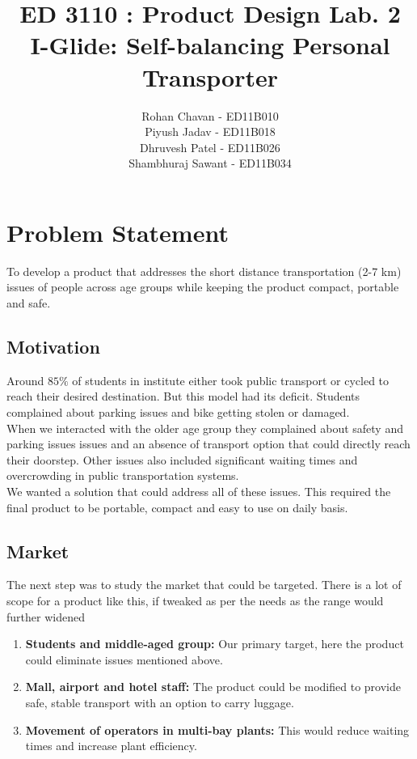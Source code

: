 \documentclass[a4paper , 12pt]{article}
\title{ ED 3110 : Product Design Lab. 2\\
   {\small {\large I-Glide: Self-balancing Personal Transporter}} }
\author{ Rohan Chavan - ED11B010\\
		Piyush Jadav - ED11B018\\
		Dhruvesh Patel - ED11B026\\
		Shambhuraj Sawant - ED11B034
		}
\begin{document}
\maketitle

\begin{abstract}
\textbf{}
\end{abstract}\newpage

\tableofcontents\newpage
\newpage
\section{Problem Statement}
To develop a product that addresses the short distance transportation (2-7 km) issues of people across age groups while keeping the product compact, portable and safe.
 
\subsection{Motivation}
Around $ 85\% $ of students in institute either took public transport or cycled to reach their desired destination. But this model had its deficit. Students complained about parking issues and bike getting stolen or damaged. \\
\newline
When we interacted with the older age group they complained about safety and parking issues issues and an absence of transport option that could directly reach their doorstep. Other issues also included significant waiting times and overcrowding in public transportation systems. \\ 
\newline
We wanted a solution that could address all of these issues. This required the final product to be portable, compact and easy to use on daily basis.
\newline

\subsection{Market}
The next step was to study the market that could be targeted. There is a lot of scope for a product like this, if tweaked as per the needs as the range would further widened
\begin{enumerate}
\item \textbf{Students and middle-aged group:} Our primary target, here the product could eliminate issues mentioned above.
\item \textbf{Mall, airport and hotel staff:} The product could be modified to provide safe, stable transport with an option to carry luggage.
\item \textbf{Movement of operators in multi-bay plants:} This would reduce waiting times and increase plant efficiency.
\end{enumerate}
\end{document}
